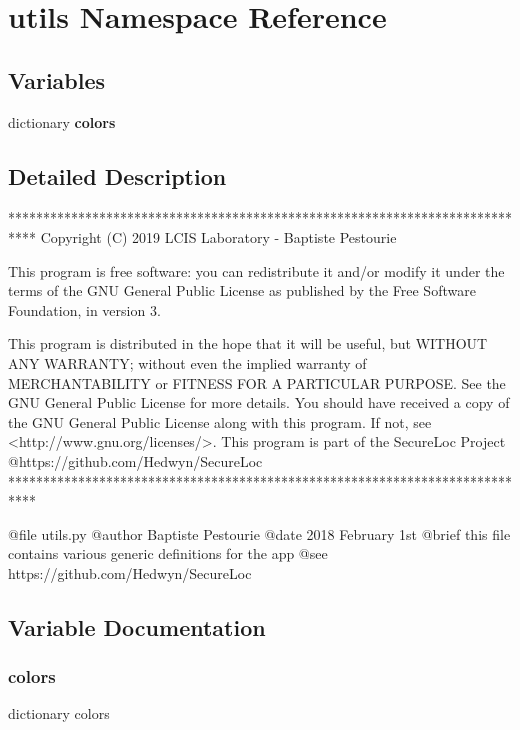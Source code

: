 \hypertarget{namespaceutils}{}\section{utils Namespace Reference}
\label{namespaceutils}
\subsection*{Variables}
\begin{DoxyCompactItemize}
\item 
dictionary {\bfseries colors}
\end{DoxyCompactItemize}


\subsection{Detailed Description}
\begin{DoxyVerb}****************************************************************************
Copyright (C) 2019 LCIS Laboratory - Baptiste Pestourie

This program is free software: you can redistribute it and/or modify
it under the terms of the GNU General Public License as published by
the Free Software Foundation, in version 3.

This program is distributed in the hope that it will be useful,
but WITHOUT ANY WARRANTY; without even the implied warranty of
MERCHANTABILITY or FITNESS FOR A PARTICULAR PURPOSE. See the
GNU General Public License for more details.
You should have received a copy of the GNU General Public License
along with this program. If not, see <http://www.gnu.org/licenses/>.
This program is part of the SecureLoc Project @https://github.com/Hedwyn/SecureLoc
 ****************************************************************************

@file utils.py
@author Baptiste Pestourie
@date 2018 February 1st
@brief this file contains various generic definitions for the app
@see https://github.com/Hedwyn/SecureLoc
\end{DoxyVerb}
 

\subsection{Variable Documentation}
\mbox{\label{namespaceutils_ad89e9af7e049010c76f01dcb9f6efb23}} 
\subsubsection{\texorpdfstring{colors}{colors}}
{\footnotesize\ttfamily dictionary colors}

